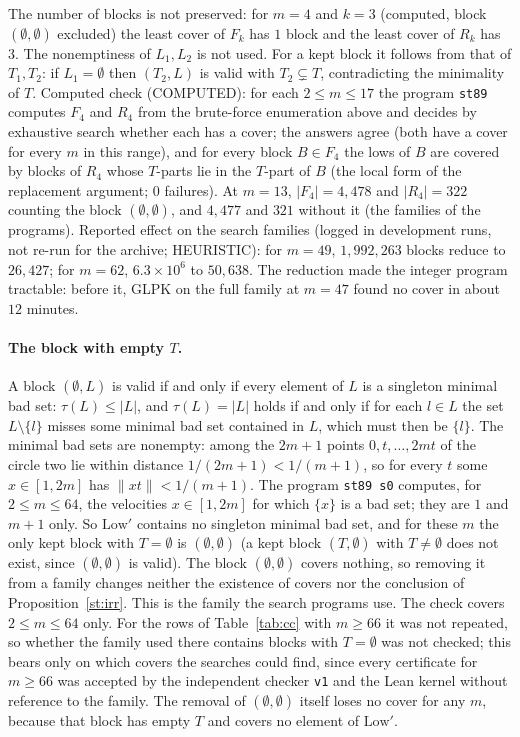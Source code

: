 \documentclass[11pt]{article}
\theoremstyle{remark}
\newcommand{\norm}[1]{\lVert #1\rVert}
\begin{document}
\noindent The number of blocks is not preserved: for $m=4$ and $k=3$ (computed, block $(\emptyset,\emptyset)$ excluded) the least cover of $F_k$ has $1$ block and the least cover of $R_k$ has $3$.
\noindent The nonemptiness of $L_1,L_2$ is not used. For a kept block it follows from that of $T_1,T_2$: if $L_1=\emptyset$ then $(T_2,L)$ is valid with $T_2\subsetneq T$, contradicting the minimality of $T$. Computed check (COMPUTED): for each $2\le m\le17$ the program \texttt{st89} computes $F_4$ and $R_4$ from the brute-force enumeration above and decides by exhaustive search whether each has a cover; the answers agree (both have a cover for every $m$ in this range), and for every block $B\in F_4$ the lows of $B$ are covered by blocks of $R_4$ whose $T$-parts lie in the $T$-part of $B$ (the local form of the replacement argument; 0 failures). At $m=13$, $|F_4|=4{,}478$ and $|R_4|=322$ counting the block $(\emptyset,\emptyset)$, and $4{,}477$ and $321$ without it (the families of the programs). Reported effect on the search families (logged in development runs, not re-run for the archive; HEURISTIC): for $m=49$, $1{,}992{,}263$ blocks reduce to $26{,}427$; for $m=62$, $6.3\times10^6$ to $50{,}638$. The reduction made the integer program tractable: before it, GLPK on the full family at $m=47$ found no cover in about $12$ minutes.

\paragraph{The block with empty $T$.}
A block $(\emptyset,L)$ is valid if and only if every element of $L$ is a singleton minimal bad set: $\tau(L)\le|L|$, and $\tau(L)=|L|$ holds if and only if for each $l\in L$ the set $L\setminus\{l\}$ misses some minimal bad set contained in $L$, which must then be $\{l\}$. The minimal bad sets are nonempty: among the $2m+1$ points $0,t,\dots,2mt$ of the circle two lie within distance $1/(2m+1)<1/(m+1)$, so for every $t$ some $x\in[1,2m]$ has $\norm{xt}<1/(m+1)$. The program \texttt{st89 s0} computes, for $2\le m\le64$, the velocities $x\in[1,2m]$ for which $\{x\}$ is a bad set; they are $1$ and $m+1$ only. So $\mathrm{Low}'$ contains no singleton minimal bad set, and for these $m$ the only kept block with $T=\emptyset$ is $(\emptyset,\emptyset)$ (a kept block $(T,\emptyset)$ with $T\ne\emptyset$ does not exist, since $(\emptyset,\emptyset)$ is valid). The block $(\emptyset,\emptyset)$ covers nothing, so removing it from a family changes neither the existence of covers nor the conclusion of Proposition~\ref{st:irr}. This is the family the search programs use. The check covers $2\le m\le64$ only. For the rows of Table~\ref{tab:cc} with $m\ge66$ it was not repeated, so whether the family used there contains blocks with $T=\emptyset$ was not checked; this bears only on which covers the searches could find, since every certificate for $m\ge66$ was accepted by the independent checker \texttt{v1} and the Lean kernel without reference to the family. The removal of $(\emptyset,\emptyset)$ itself loses no cover for any $m$, because that block has empty $T$ and covers no element of $\mathrm{Low}'$.
\end{document}
